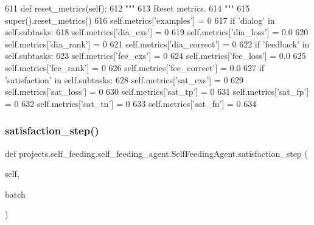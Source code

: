 \begin{DoxyCode}
611     \textcolor{keyword}{def }reset\_metrics(self):
612         \textcolor{stringliteral}{"""}
613 \textcolor{stringliteral}{        Reset metrics.}
614 \textcolor{stringliteral}{        """}
615         super().reset\_metrics()
616         self.metrics[\textcolor{stringliteral}{'examples'}] = 0
617         \textcolor{keywordflow}{if} \textcolor{stringliteral}{'dialog'} \textcolor{keywordflow}{in} self.subtasks:
618             self.metrics[\textcolor{stringliteral}{'dia\_exs'}] = 0
619             self.metrics[\textcolor{stringliteral}{'dia\_loss'}] = 0.0
620             self.metrics[\textcolor{stringliteral}{'dia\_rank'}] = 0
621             self.metrics[\textcolor{stringliteral}{'dia\_correct'}] = 0
622         \textcolor{keywordflow}{if} \textcolor{stringliteral}{'feedback'} \textcolor{keywordflow}{in} self.subtasks:
623             self.metrics[\textcolor{stringliteral}{'fee\_exs'}] = 0
624             self.metrics[\textcolor{stringliteral}{'fee\_loss'}] = 0.0
625             self.metrics[\textcolor{stringliteral}{'fee\_rank'}] = 0
626             self.metrics[\textcolor{stringliteral}{'fee\_correct'}] = 0.0
627         \textcolor{keywordflow}{if} \textcolor{stringliteral}{'satisfaction'} \textcolor{keywordflow}{in} self.subtasks:
628             self.metrics[\textcolor{stringliteral}{'sat\_exs'}] = 0
629             self.metrics[\textcolor{stringliteral}{'sat\_loss'}] = 0
630             self.metrics[\textcolor{stringliteral}{'sat\_tp'}] = 0
631             self.metrics[\textcolor{stringliteral}{'sat\_fp'}] = 0
632             self.metrics[\textcolor{stringliteral}{'sat\_tn'}] = 0
633             self.metrics[\textcolor{stringliteral}{'sat\_fn'}] = 0
634 
\end{DoxyCode}
\mbox{\label{classprojects_1_1self__feeding_1_1self__feeding__agent_1_1SelfFeedingAgent_a4e504bd6e7179930122bcec4a658e30f}} 
\subsubsection{\texorpdfstring{satisfaction\+\_\+step()}{satisfaction\_step()}}
{\footnotesize\ttfamily def projects.\+self\+\_\+feeding.\+self\+\_\+feeding\+\_\+agent.\+Self\+Feeding\+Agent.\+satisfaction\+\_\+step (\begin{DoxyParamCaption}\item[{}]{self,  }\item[{}]{batch }\end{DoxyParamCaption})}



